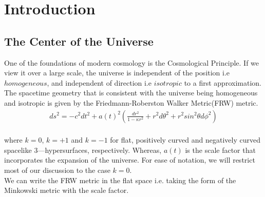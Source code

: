\chapter{Introduction}
\section{The Center of the Universe}

One of the foundations of modern cosmology is the Cosmological Principle. If we view it over a large scale, the universe is independent of the position i.e $homogeneous$, and independent of direction i.e $isotropic$ to a first approximation.
The spacetime geometry that is consistent with the universe being homogeneous and isotropic is given by the Friedmann-Roberston Walker Metric(FRW) metric.
\begin{align}
     ds^2= -c^2dt^2 + a(t)^2\left(\frac{dr^2}{1-\kappa r^2}+ r^2d\theta^2 +r^2sin^2\theta d\phi^2\right )\label{eq:1.1}
\end{align}\\
where $k = 0$, $k = +1$ and 
$k = -1$ for flat, positively curved and negatively curved spacelike $3$---hypersurfaces, respectively. Whereas, $a(t)$ is the scale factor that incorporates the expansion of the universe. For ease of notation, we will restrict most of our discussion to the case $k = 0$.
\hspace{0.5cm}\\
We can write the FRW metric in the flat space i.e. taking the form of the Minkowski metric with the scale factor.

